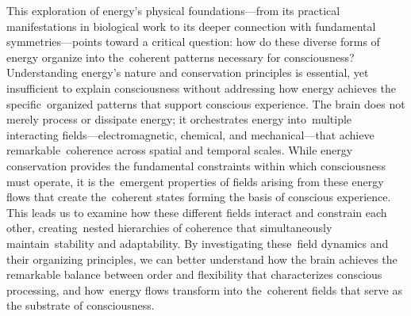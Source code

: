 This exploration of energy's physical foundations—from its practical manifestations in biological work to its deeper connection with fundamental symmetries—points toward a critical question: how do these diverse forms of energy organize into the~coherent patterns necessary for consciousness? Understanding energy's nature and conservation principles is essential, yet insufficient to explain consciousness without addressing how energy achieves the specific~organized patterns that support conscious experience. The brain does not merely process or dissipate energy; it orchestrates energy into~multiple interacting fields—electromagnetic, chemical, and mechanical—that achieve remarkable~coherence across spatial and temporal scales. While energy conservation provides the fundamental constraints within which consciousness must operate, it is the~emergent properties of fields arising from these energy flows that create the~coherent states forming the basis of conscious experience. This leads us to examine how these different fields interact and constrain each other, creating~nested hierarchies of coherence that simultaneously maintain~stability and adaptability. By investigating these~field dynamics and their organizing principles, we can better understand how the brain achieves the remarkable balance between order and flexibility that characterizes conscious processing, and how~energy flows transform into the~coherent fields that serve as the substrate of consciousness.
